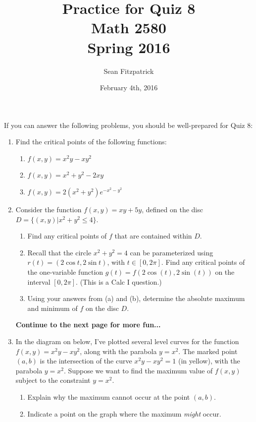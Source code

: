 \documentclass[letterpaper,12pt]{article}
\title{Practice for Quiz 8\\Math 2580\\Spring 2016}
\author{Sean Fitzpatrick}
\date{February 4th, 2016}
\begin{document}
 \maketitle

If you can answer the following problems, you should be well-prepared for Quiz 8:



\begin{enumerate}
 \item Find the critical points of the following functions:
\begin{enumerate}
 \item $f(x,y) = x^2y-xy^2$
 \item $f(x,y) = x^2+y^2-2xy$
 \item $f(x,y) = 2(x^2+y^2)e^{-x^2-y^2}$
\end{enumerate}
 \item Consider the function $f(x,y)=xy+5y$, defined on the disc $D=\{(x,y) | x^2+y^2\leq 4\}$.
\begin{enumerate}
 \item Find any critical points of $f$ that are contained within $D$.
 \item Recall that the circle $x^2+y^2=4$ can be parameterized using $r(t) = (2\cos t, 2\sin t)$, with $t\in [0,2\pi]$. Find any critical points of the one-variable function $g(t) = f(2\cos(t),2\sin(t))$ on the interval $[0,2\pi]$. (This is a Calc I question.)
 \item Using your answers from (a) and (b), determine the absolute maximum and minimum of $f$ on the disc $D$.
\end{enumerate}

{\bf Continue to the next page for more fun...}

\pagebreak
\item In the diagram on below, I've plotted several level curves for the function $f(x,y)=x^2y-xy^2$, along with the parabola $y=x^2$. The marked point $(a,b)$ is the intersection of the curve $x^2y-xy^2=1$ (in yellow), with the parabola $y=x^2$. Suppose we want to find the maximum value of $f(x,y)$ subject to the constraint $y=x^2$.
\begin{enumerate}
 \item Explain why the maximum cannot occur at the point $(a,b)$.
 \item Indicate a point on the graph where the maximum {\em might} occur.
\end{enumerate}


\end{enumerate}
\end{document}
